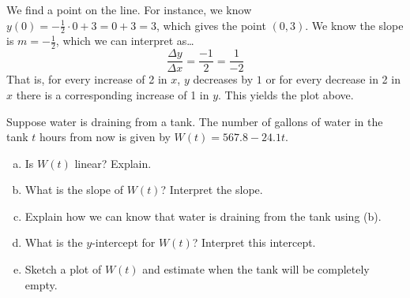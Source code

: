 \documentclass[11pt,letterpaper]{article}
\begin{document}
We find a point on the line. For instance, we know $y(0)= -\frac{1}{2} \cdot 0 + 3= 0 + 3= 3$, which gives the point $(0, 3)$. We know the slope is $m= -\frac{1}{2}$, which we can interpret as\dots
	\[
	\dfrac{\Delta y}{\Delta x}= \dfrac{-1}{2}= \dfrac{1}{-2}
	\]
That is, for every increase of 2 in $x$, $y$ decreases by $1$ or for every decrease in 2 in $x$ there is a corresponding increase of 1 in $y$. This yields the plot above. 



\newpage



 Suppose water is draining from a tank. The number of gallons of water in the tank $t$ hours from now is given by $W(t)= 567.8 - 24.1t$.
\begin{enumerate}[(a)]
\item Is $W(t)$ linear? Explain.
\item What is the slope of $W(t)$? Interpret the slope.
\item Explain how we can know that water is draining from the tank using (b).
\item What is the $y$-intercept for $W(t)$? Interpret this intercept. 
\item Sketch a plot of $W(t)$ and estimate when the tank will be completely empty. 
\end{enumerate} 
\end{document}
